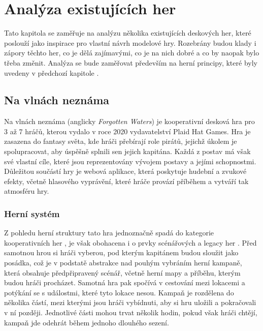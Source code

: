 \chapter{Analýza existujících her}
\label{chap:game_analysis}

Tato kapitola se zaměřuje na analýzu několika existujících deskových her, které poslouží jako inspirace pro vlastní návrh modelové hry. Rozebrány budou klady i zápory těchto her, co je dělá zajímavými, co je na nich dobré a co by naopak bylo třeba změnit. Analýza se bude zaměřovat především na herní principy, které byly uvedeny v předchozí kapitole .



\section{Na vlnách neznáma}
\label{sec:forgotten_waters}

Na vlnách neznáma (anglicky \textit{Forgotten Waters}) je kooperativní desková hra pro 3 až 7 hráčů, kterou vydalo v roce 2020 vydavatelství Plaid Hat Games. Hra je zasazena do fantasy světa, kde hráči přebírají role pirátů, jejichž úkolem je spolupracovat, aby úspěšně splnili sen jejich kapitána. Každá z postav má však své vlastní cíle, které jsou reprezentovány vývojem postavy a jejími schopnostmi. Důležitou součástí hry je webová aplikace, která poskytuje hudební a zvukové efekty, včetně hlasového vyprávění, které hráče provází příběhem a vytváří tak atmosféru hry. \cite{forgotten_waters}


\subsection{Herní systém}
\label{subsec:fw_gameplay}

Z pohledu herní struktury tato hra jednoznačně spadá do kategorie kooperativních her , je však obohacena i o prvky scénářových  a legacy her . Před samotnou hrou si hráči vyberou, pod kterým kapitánem budou sloužit jako posádka, což je v podstatě abstrakce nad pouhým vybráním herní kampaně, která obsahuje předpřipravený scénář, včetně herní mapy a příběhu, kterým budou hráči procházet. Samotná hra pak spočívá v cestování mezi lokacemi a potýkání se s událostmi, které tyto lokace nesou. Kampaň je rozdělena do několika částí, mezi kterými jsou hráči vybídnuti, aby si hru uložili a pokračovali v ní později. Jednotlivé části mohou trvat několik hodin, pokud však hráči chtějí, kampaň jde odehrát během jednoho dlouhého sezení.

